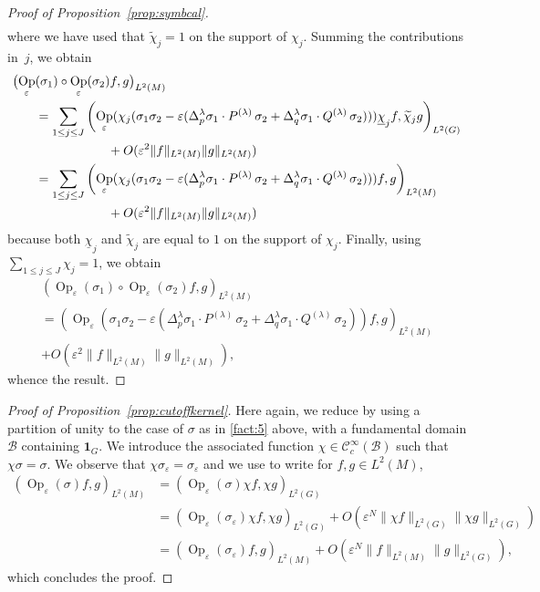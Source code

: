 \documentclass[10pt]{amsart}
\let\mathcal\mathscr
\newcommand{\bun}{\mathbf{1}}
\DeclareMathOperator{\Op}{Op}
\theoremstyle{plain}
\theoremstyle{definition}
\let\eps\varepsilon
\begin{document}
\begin{proof}[Proof of Proposition~\ref{prop:symbcal}]
\begin{align*}
\end{align*}
where we have used that $\widetilde \chi_j=1$ on the support of $\chi_j$.
Summing the contributions in~$j$, we obtain
\begin{align*}
\bigl(\Op_\eps &(\sigma_1)\circ \Op_\eps (\sigma_2) f,g\bigr)_{L^2(M)}\\
&= \sum_{1\leq j\leq J} \left(\Op_\eps (\chi_j (\sigma_1 \sigma_2 -\eps (\Delta_p^\lambda \sigma_1 \cdot P^{(\lambda)}\,\sigma_2+\Delta^\lambda_q \sigma_1 \cdot Q^{(\lambda)}\, \sigma_2)
)) \underline \chi_jf, \widetilde \chi_j g\right)_{L^2(G)}
\\&\hspace*{2cm}
+O(\eps^2\| f\|_{L^2(M)}\| g\|_{L^2(M)}) \\
& = \sum_{1\leq j\leq J} \left(\Op_\eps (\chi_j (\sigma_1 \sigma_2 -\eps (\Delta_p^\lambda \sigma_1 \cdot P^{(\lambda)}\,\sigma_2+\Delta^\lambda_q \sigma_1 \cdot Q^{(\lambda)}\, \sigma_2)
))f, g\right)_{L^2(M)} \\
&\hspace*{2cm}+O(\eps^2\| f\|_{L^2(M)}\| g\|_{L^2(M)})
\end{align*}
because both $\underline \chi_j$ and $\widetilde \chi_j$ are equal to $1$ on the support of $\chi_j$. Finally, using $\sum_{1\leq j\leq J} \chi_j=1$, we obtain
\begin{multline*}
\left(\Op_\eps (\sigma_1)\circ \Op_\eps (\sigma_2) f,g\right)_{L^2(M)}\\
 = \left(\Op_\eps (\sigma_1 \sigma_2 -\eps (\Delta_p^\lambda \sigma_1 \cdot P^{(\lambda)}\,\sigma_2+\Delta^\lambda_q \sigma_1 \cdot Q^{(\lambda)}\, \sigma_2))
f, g\right)_{L^2(M)} \\
+O(\eps^2\| f\|_{L^2(M)}\| g\|_{L^2(M)}),
\end{multline*}
whence the result.
\end{proof}


\begin{proof}[Proof of Proposition~\ref{prop:cutoffkernel}]
Here again, we reduce by using a partition of unity to the case of $\sigma$ as in \eqref{fact:5} above, with a fundamental domain $\mathcal B$ containing $\bun_G$. We introduce the associated function $\chi\in{\mathcal C}_c^\infty(\mathcal B)$ such that $\chi \sigma =\sigma$. We observe that $\chi\sigma_\eps=\sigma_\eps$ and we use \cite[Prop.\,3.4]{FF1} to write for $f,g\in L^2(M)$,
\begin{align*}
\left(\Op_\eps (\sigma) f,g\right)_{L^2(M)}&= \left(\Op_\eps (\sigma) \chi f,\chi g\right)_{L^2(G)}\\
&= \left(\Op_\eps (\sigma_\eps)\chi f,\chi g\right)_{L^2(G)} +O(\eps ^{N} \|\chi f\|_{L^2(G)} \| \chi g\|_{L^2(G)})\\
&= \left(\Op_\eps (\sigma_\eps) f,g\right)_{L^2(M)} +O(\eps ^{N} \| f\|_{L^2(M)} \| g\|_{L^2(G)}),
\end{align*}
which concludes the proof.
\end{proof}
\end{document}
